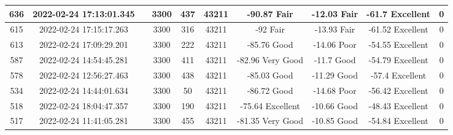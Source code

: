 \begin{longtable*}{|c|c|c|c|c|c|c|c|c|c|}
636&2022-02-24 17:13:01.345&&3300&437&43211& -90.87    Fair        & -12.03    Fair        & -61.7     Excellent   & 0\\\hline
{}615&2022-02-24 17:15:17.263&&3300&316&43211& -92       Fair        & -13.93    Fair        & -61.52    Excellent   & 0\\\hline
{}613&2022-02-24 17:09:29.201&&3300&222&43211& -85.76    Good        & -14.06    Poor        & -54.55    Excellent   & 0\\\hline
{}587&2022-02-24 14:54:45.281&&3300&411&43211& -82.96    Very Good   & -11.7     Good        & -54.79    Excellent   & 0\\\hline
{}578&2022-02-24 12:56:27.463&&3300&438&43211& -85.03    Good        & -11.29    Good        & -57.4     Excellent   & 0\\\hline
{}534&2022-02-24 14:44:01.634&&3300&50&43211& -86.72    Good        & -14.68    Poor        & -56.42    Excellent   & 0\\\hline
{}518&2022-02-24 18:04:47.357&&3300&190&43211& -75.64    Excellent   & -10.66    Good        & -48.43    Excellent   & 0\\\hline
{}517&2022-02-24 11:41:05.281&&3300&455&43211& -81.35    Very Good   & -10.85    Good        & -54.84    Excellent   & 0\\\hline

\end{longtable*}
